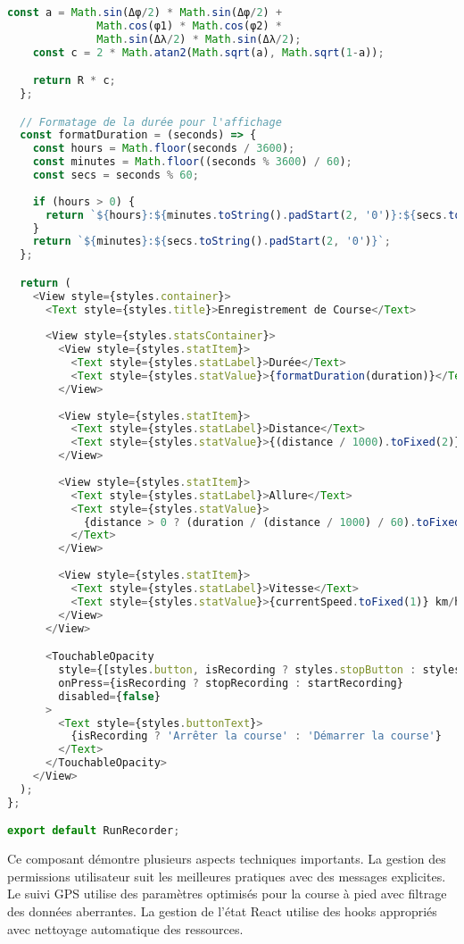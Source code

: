 \begin{lstlisting}[language=javascript, caption=Composant d'enregistrement de course]
    const a = Math.sin(Δφ/2) * Math.sin(Δφ/2) +
              Math.cos(φ1) * Math.cos(φ2) *
              Math.sin(Δλ/2) * Math.sin(Δλ/2);
    const c = 2 * Math.atan2(Math.sqrt(a), Math.sqrt(1-a));

    return R * c;
  };

  // Formatage de la durée pour l'affichage
  const formatDuration = (seconds) => {
    const hours = Math.floor(seconds / 3600);
    const minutes = Math.floor((seconds % 3600) / 60);
    const secs = seconds % 60;
    
    if (hours > 0) {
      return `${hours}:${minutes.toString().padStart(2, '0')}:${secs.toString().padStart(2, '0')}`;
    }
    return `${minutes}:${secs.toString().padStart(2, '0')}`;
  };

  return (
    <View style={styles.container}>
      <Text style={styles.title}>Enregistrement de Course</Text>
      
      <View style={styles.statsContainer}>
        <View style={styles.statItem}>
          <Text style={styles.statLabel}>Durée</Text>
          <Text style={styles.statValue}>{formatDuration(duration)}</Text>
        </View>
        
        <View style={styles.statItem}>
          <Text style={styles.statLabel}>Distance</Text>
          <Text style={styles.statValue}>{(distance / 1000).toFixed(2)} km</Text>
        </View>
        
        <View style={styles.statItem}>
          <Text style={styles.statLabel}>Allure</Text>
          <Text style={styles.statValue}>
            {distance > 0 ? (duration / (distance / 1000) / 60).toFixed(2) : '0.00'} min/km
          </Text>
        </View>
        
        <View style={styles.statItem}>
          <Text style={styles.statLabel}>Vitesse</Text>
          <Text style={styles.statValue}>{currentSpeed.toFixed(1)} km/h</Text>
        </View>
      </View>

      <TouchableOpacity
        style={[styles.button, isRecording ? styles.stopButton : styles.startButton]}
        onPress={isRecording ? stopRecording : startRecording}
        disabled={false}
      >
        <Text style={styles.buttonText}>
          {isRecording ? 'Arrêter la course' : 'Démarrer la course'}
        </Text>
      </TouchableOpacity>
    </View>
  );
};

export default RunRecorder;
\end{lstlisting}

Ce composant démontre plusieurs aspects techniques importants. La gestion des permissions utilisateur suit les meilleures pratiques avec des messages explicites. Le suivi GPS utilise des paramètres optimisés pour la course à pied avec filtrage des données aberrantes. La gestion de l'état React utilise des hooks appropriés avec nettoyage automatique des ressources.

